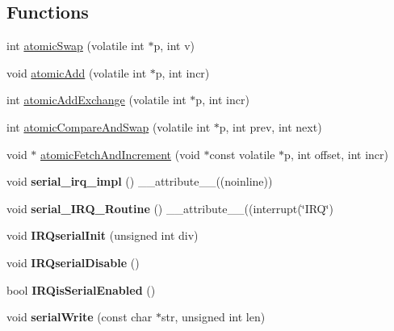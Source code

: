 \subsection*{Functions}
\begin{DoxyCompactItemize}
\item 
int \hyperlink{namespacemiosix_a255e5aa443a97bb24652ae2223eb3dcf}{atomic\-Swap} (volatile int $\ast$p, int v)
\item 
void \hyperlink{namespacemiosix_a5b8368b53c183f68f890ce009577955c}{atomic\-Add} (volatile int $\ast$p, int incr)
\item 
int \hyperlink{namespacemiosix_aae061ab6b48f0b59593b60f1f7bf0468}{atomic\-Add\-Exchange} (volatile int $\ast$p, int incr)
\item 
int \hyperlink{namespacemiosix_ac5ca8a635f3a0a8e5308ff0d25379326}{atomic\-Compare\-And\-Swap} (volatile int $\ast$p, int prev, int next)
\item 
void $\ast$ \hyperlink{namespacemiosix_ac000ad5b9d1713812427bd7d73fd016d}{atomic\-Fetch\-And\-Increment} (void $\ast$const volatile $\ast$p, int offset, int incr)
\item 
\hypertarget{namespacemiosix_a37c2fa85601e4e0c962f6c96561b623c}{void {\bfseries serial\-\_\-irq\-\_\-impl} () \-\_\-\-\_\-attribute\-\_\-\-\_\-((noinline))}\label{namespacemiosix_a37c2fa85601e4e0c962f6c96561b623c}

\item 
\hypertarget{namespacemiosix_a2ce18997c6dec93596da33e17b84133b}{void {\bfseries serial\-\_\-\-I\-R\-Q\-\_\-\-Routine} () \-\_\-\-\_\-attribute\-\_\-\-\_\-((interrupt(\char`\"{}I\-R\-Q\char`\"{})}\label{namespacemiosix_a2ce18997c6dec93596da33e17b84133b}

\item 
\hypertarget{namespacemiosix_a4c9c8d33397626ef54c95f85f3e55c99}{void {\bfseries I\-R\-Qserial\-Init} (unsigned int div)}\label{namespacemiosix_a4c9c8d33397626ef54c95f85f3e55c99}

\item 
\hypertarget{namespacemiosix_aecea4141b297e5ea0bf6a89067dc1611}{void {\bfseries I\-R\-Qserial\-Disable} ()}\label{namespacemiosix_aecea4141b297e5ea0bf6a89067dc1611}

\item 
\hypertarget{namespacemiosix_aa01d75e83f9de336532feb4eb2aeb1fe}{bool {\bfseries I\-R\-Qis\-Serial\-Enabled} ()}\label{namespacemiosix_aa01d75e83f9de336532feb4eb2aeb1fe}

\item 
\hypertarget{namespacemiosix_acecf25995a3cad960e40e48ec7dd1d7e}{void {\bfseries serial\-Write} (const char $\ast$str, unsigned int len)}\label{namespacemiosix_acecf25995a3cad960e40e48ec7dd1d7e}


\end{DoxyCompactItemize}
